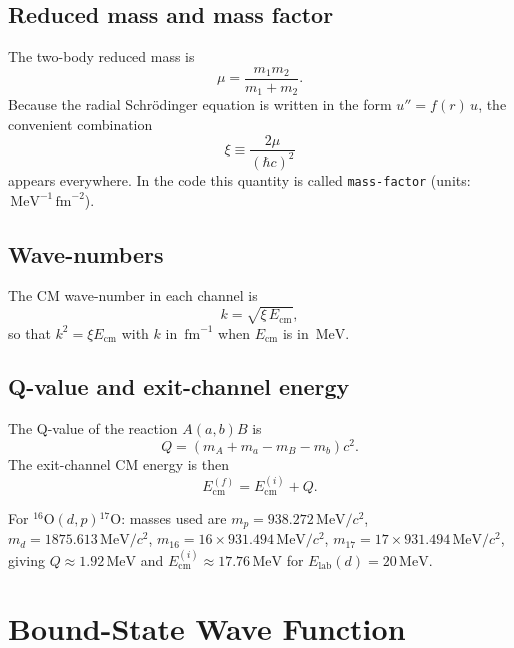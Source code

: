 \documentclass[12pt,a4paper]{article}
\newcommand{\fm}{\,\mathrm{fm}}
\newcommand{\MeV}{\,\mathrm{MeV}}
\begin{document}
\subsection{Reduced mass and mass factor}

The two-body reduced mass is
\begin{equation}
  \mu = \frac{m_1 m_2}{m_1+m_2}.
\end{equation}
Because the radial Schrödinger equation is written in the form
$u'' = f(r)\,u$, the convenient combination
\begin{equation}
  \xi \equiv \frac{2\mu}{(\hbar c)^2}
  \label{eq:mass-factor}
\end{equation}
appears everywhere.  In the code this quantity is called
\texttt{mass-factor} (units: $\MeV^{-1}\fm^{-2}$).

\subsection{Wave-numbers}

The CM wave-number in each channel is
\begin{equation}
  k = \sqrt{\xi\, E_\mathrm{cm}},
  \label{eq:wave-number}
\end{equation}
so that $k^2 = \xi E_\mathrm{cm}$ with $k$ in $\fm^{-1}$ when
$E_\mathrm{cm}$ is in $\MeV$.

\subsection{Q-value and exit-channel energy}

The Q-value of the reaction $A(a,b)B$ is
\begin{equation}
  Q = (m_A + m_a - m_B - m_b)c^2.
\end{equation}
The exit-channel CM energy is then
\begin{equation}
  E_\mathrm{cm}^{(f)} = E_\mathrm{cm}^{(i)} + Q.
\end{equation}

For ${}^{16}\mathrm{O}(d,p){}^{17}\mathrm{O}$:
masses used are $m_p = 938.272\MeV/c^2$, $m_d = 1875.613\MeV/c^2$,
$m_{16} = 16\times931.494\MeV/c^2$, $m_{17} = 17\times931.494\MeV/c^2$,
giving $Q \approx 1.92\MeV$ and
$E_\mathrm{cm}^{(i)} \approx 17.76\MeV$ for $E_\mathrm{lab}(d)=20\MeV$.

\section{Bound-State Wave Function}
\end{document}
